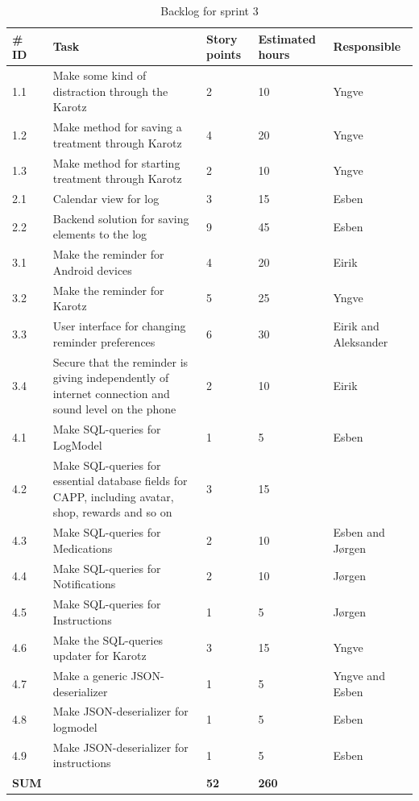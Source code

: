 \begin{table}
	\begin{center}
		\begin{tabular}{|p{2.0cm}| p{8.0cm}| p{2.0cm}|p{2.0cm}|p{2.0cm}|}
			\hline
			\#  ID 	& Task 	& Story points 	& Estimated hours & Responsible \\
			\hline
			1.1 & Make some kind of distraction through the Karotz & 2 & 10 & Yngve\\
			\hline
			1.2 & Make method for saving a treatment through Karotz & 4 & 20 & Yngve \\
			\hline
			1.3 & Make method for starting treatment through Karotz & 2 & 10 & Yngve \\
			\hline
			2.1 & Calendar view for log & 3 & 15 & Esben \\
			\hline
			2.2 & Backend solution for saving elements to the log & 9 & 45 & Esben\\
			\hline
			3.1 & Make the reminder for Android devices & 4 & 20 & Eirik\\
			\hline
			3.2 & Make the reminder for Karotz & 5 & 25 & Yngve\\
			\hline
			3.3 & User interface for changing reminder preferences & 6 & 30 & Eirik and Aleksander\\
			\hline
			3.4 & Secure that the reminder is giving independently of internet connection and sound level on the phone & 2 & 10 & Eirik\\
			\hline
			4.1 & Make SQL-queries for LogModel & 1 & 5 & Esben \\
			\hline
			4.2 & Make SQL-queries for essential database fields for CAPP, including avatar, shop, rewards and so on & 3 & 15 & \\
			\hline
			4.3 & Make SQL-queries for Medications & 2 & 10 & Esben and J\o rgen \\
			\hline
			4.4 & Make SQL-queries for Notifications & 2 & 10 & J\o rgen \\
			\hline
			4.5 & Make SQL-queries for Instructions & 1 & 5 & J\o rgen \\
			\hline
			4.6 & Make the SQL-queries updater for Karotz & 3 & 15 & Yngve \\
			\hline
			4.7 & Make a generic JSON-deserializer  & 1 & 5 & Yngve and Esben \\
			\hline
			4.8 & Make JSON-deserializer for logmodel & 1 & 5 & Esben\\
			\hline
			4.9 & Make JSON-deserializer for instructions & 1 & 5 & Esben\\
			\hline
			\bfseries{SUM} & & \bfseries{52} & \bfseries{260} & \\
			\hline
			\hline
		\end{tabular}
	\end{center}
	\caption{Backlog for sprint 3}
\end{table}

